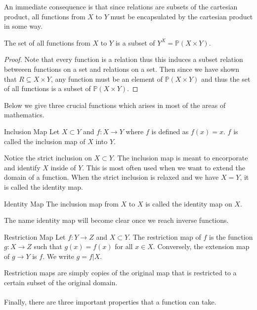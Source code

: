 An immediate consequence is that since relations are subsets of the cartesian product, all functions from $X$ to $Y$ must be encapsulated by the cartesian product in some way. 

\begin{prp}{}{} The set of all functions from $X$ to $Y$ is a subset of $Y^X=\mathbb{P}(X\times Y)$. \tcbline
\begin{proof}{}{} Note that every function is a relation thus this induces a subset relation betweeen functions on a set and relations on a set. Then since we have shown that $R\subseteq X\times Y$, any function must be an element of $\mathbb{P}(X\times Y)$ and thus the set of all functions is a subset of $\mathbb{P}(X\times Y)$. 
\end{proof}
\end{prp}

Below we give three crucial functions which arises in most of the areas of mathematics. 

\begin{defn}{Inclusion Map}{} Let $X\subset Y$ and $f:X\to Y$ where $f$ is defined as $f(x)=x$. $f$ is called the inclusion map of $X$ into $Y$. 
\end{defn}

Notice the strict inclusion on $X\subset Y$. The inclusion map is meant to encorporate and identify $X$ inside of $Y$. This is most often used when we want to extend the domain of a function. When the strict inclusion is relaxed and we have $X=Y$, it is called the identity map. 

\begin{defn}{Identity Map}{} The inclusion map from $X$ to $X$ is called the identity map on $X$. 
\end{defn}

The name identity map will become clear once we reach inverse functions. 

\begin{defn}{Restriction Map}{} Let $f:Y\to Z$ and $X\subset Y$. The restriction map of $f$ is the function $g:X\to Z$ such that $g(x)=f(x)$ for all $x\in X$. Conversely, the extension map of $g\to Y$ is $f$. We write $g=f|X$. 
\end{defn}

Restriction maps are simply copies of the original map that is restricted to a certain subset of the original domain. \\~\\

Finally, there are three important properties that a function can take. 

